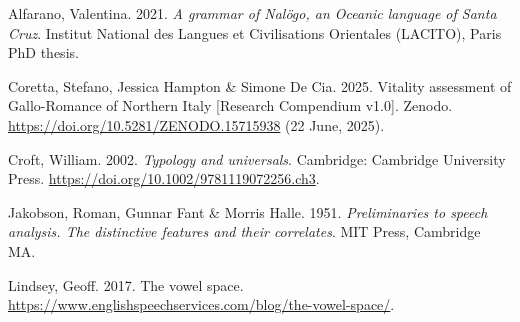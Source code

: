 \documentclass[
]{rrling}
\newlength{\cslhangindent}
\newenvironment{CSLReferences}[2] %
 {\begin{list}{}{%
  \setlength{\itemindent}{0pt}
  \setlength{\leftmargin}{0pt}
  \setlength{\parsep}{0pt}
  \ifodd #1
   \setlength{\leftmargin}{\cslhangindent}
   \setlength{\itemindent}{-1\cslhangindent}
  \fi
  \setlength{\itemsep}{#2\baselineskip}}}
 {\end{list}}
\begin{document}
\label{refs}
\begin{CSLReferences}{1}{0}
Alfarano, Valentina. 2021. \emph{A grammar of {Nal{ö}go}, an {Oceanic}
language of {Santa Cruz}}. Institut National des Langues et
Civilisations Orientales (LACITO), Paris PhD thesis.

Coretta, Stefano, Jessica Hampton \& Simone De Cia. 2025. Vitality
assessment of {Gallo-Romance} of {Northern Italy} {[}{Research
Compendium} v1.0{]}. Zenodo.
\url{https://doi.org/10.5281/ZENODO.15715938} (22 June, 2025).

Croft, William. 2002. \emph{Typology and universals}. Cambridge:
Cambridge University Press.
\url{https://doi.org/10.1002/9781119072256.ch3}.

Jakobson, Roman, Gunnar Fant \& Morris Halle. 1951. \emph{Preliminaries
to speech analysis. {The} distinctive features and their correlates}.
MIT Press, Cambridge MA.

Lindsey, Geoff. 2017. The vowel space.
\url{https://www.englishspeechservices.com/blog/the-vowel-space/}.

\end{CSLReferences}
\end{document}

